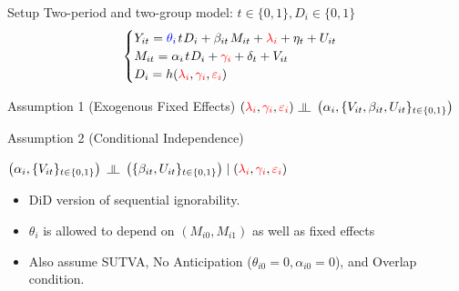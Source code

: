 \documentclass[aspectratio=1610, 9pt]{beamer}
\newcommand{\indep}{\rotatebox[origin=c]{90}{$\models$}}
\begin{document}
\begin{frame}{Setup}
Two-period and two-group model: $t\in \{0,1\}, D_i\in\{0,1\} $
\[ 
\begin{cases}
     Y_{it} = \textcolor{blue}{\theta_i} \hspace{0.1em} t  \hspace{0.06em} D_i   +{\beta_{it}} \hspace{0.1em} M_{it}+ \textcolor{red}{\lambda_i}+\eta_t+{U_{it}} \\
     M_{it} = {\alpha_i}\hspace{0.1em} t \hspace{0.06em} D_i   + \textcolor{red}{\gamma_i} +\delta_t +{V_{it}} \\
     D_i = h(\textcolor{red}{\lambda_i},\textcolor{red}{\gamma_i},\textcolor{red}{\varepsilon_i})
\end{cases}
\]


\begin{block}{Assumption 1 (Exogenous Fixed Effects)}
    $(\textcolor{red}{\lambda_i},\textcolor{red}{\gamma_i},\textcolor{red}{\varepsilon_i}) \ \indep\ \left( {\alpha_i}, \{{V_{it}},{\beta_{it}}, {U_{it}}\}_{t\in\{0,1\}} \right) $
\end{block}


\begin{block}{Assumption 2 (Conditional Independence)}

$   \left( {\alpha_i}, \{{V_{it}}\}_{t\in\{0,1\}}\right) \ \indep\ \left(\{ {\beta_{it}},{U_{it}}\}_{t\in\{0,1\}}\right) \mid (\textcolor{red}{\lambda_i},\textcolor{red}{\gamma_i},\textcolor{red}{\varepsilon_i})$
    
\end{block}

\vspace{0.3cm}

\begin{itemize}
    \item DiD version of sequential ignorability.
    \item $\theta_i$ is allowed to depend on $(M_{i0},M_{i1})$ as well as fixed effects
    \item Also assume SUTVA, No Anticipation ($\theta_{i0}=0,\alpha_{i0}=0$), and Overlap condition.
\end{itemize}

\end{frame}
\end{document}
